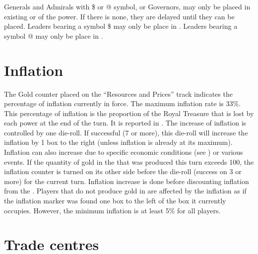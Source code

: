 Generals and Admirals with \$ or @ symbol, or Governors, may only be placed in
existing \COL or \TP of the power. If there is none, they are delayed until
they can be placed.
\bparag Leaders bearing a symbol \$ may only be place in .
\bparag Leaders bearing a symbol @ may only be place in .



\section{Inflation}

\aparag The Gold counter placed on the ``Resources and Prices'' track
indicates the percentage of inflation currently in force. The maximum
inflation rate is 33\%.
\bparag This percentage of inflation is the proportion of the Royal Treasure
that is lost by each power at the end of the turn. It is reported in
.
 The increase of inflation is controlled by one
die-roll. If successful (7 or more), this die-roll will increase the inflation
by 1 box to the right (unless inflation is already at its maximum).
\bparag Inflation can also increase due to specific economic conditions (see
) or various events.
\bparag \label{chInter:InflationGoldROTW} If the quantity of gold in the \ROTW
that was produced this turn exceeds 100\ducats, the inflation counter is
turned on its other side before the die-roll (success on 3 or more) for the
current turn.
\bparag Inflation increase is done before discounting inflation from the \RT.
 \label{chInter:InflationGold} Players that do not
produce gold in  are affected by the inflation as if the
inflation marker was found one box to the left of the box it currently
occupies.
\bparag However, the minimum inflation is at least 5\% for all players.



\section{Trade centres}\label{chInter:TradeCentres}

